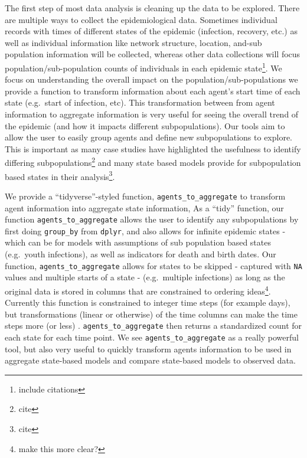 \documentclass[
  shortnames]{jss}
\begin{document}
The first step of most data analysis is cleaning up the data to be
explored. There are multiple ways to collect the epidemiological data.
Sometimes individual records with times of different states of the
epidemic (infection, recovery, etc.) as well as individual information
like network structure, location, and-sub population information will be
collected, whereas other data collections will focus
population/sub-population counts of individuals in each epidemic
state\footnote{\@Shannon include citations}. We focus on understanding
the overall impact on the population/sub-populations we provide a
function to transform information about each agent's start time of each
state (e.g.~start of infection, etc). This transformation between from
agent information to aggregate information is very useful for seeing the
overall trend of the epidemic (and how it impacts different
subpopulations). Our tools aim to allow the user to easily group agents
and define new subpopulations to explore. This is important as many case
studies have highlighted the usefulness to identify differing
subpopulations\footnote{\@Shannon cite} and many state based models
provide for subpopulation based states in their
analysis\footnote{\@Shannon cite}.

We provide a ``tidyverse''-styled function,
\texttt{agents\_to\_aggregate} to transform agent information into
aggregate state information, As a ``tidy'' function, our function
\texttt{agents\_to\_aggregate} allows the user to identify any
subpopulations by first doing \texttt{group\_by} from \texttt{dplyr},
and also allows for infinite epidemic states - which can be for models
with assumptions of sub population based states (e.g.~youth infections),
as well as indicators for death and birth dates. Our function,
\texttt{agents\_to\_aggregate} allows for states to be skipped -
captured with \texttt{NA} values and multiple starts of a state -
(e.g.~multiple infections) as long as the original data is stored in
columns that are constrained to ordering
ideas\footnote{make this more clear?}. Currently this function is
constrained to integer time steps (for example days), but
transformations (linear or otherwise) of the time columns can make the
time steps more (or less) . \texttt{agents\_to\_aggregate} then returns
a standardized count for each state for each time point. We see
\texttt{agents\_to\_aggregate} as a really powerful tool, but also very
useful to quickly transform agents information to be used in aggregate
state-based models and compare state-based models to observed data.
\end{document}
